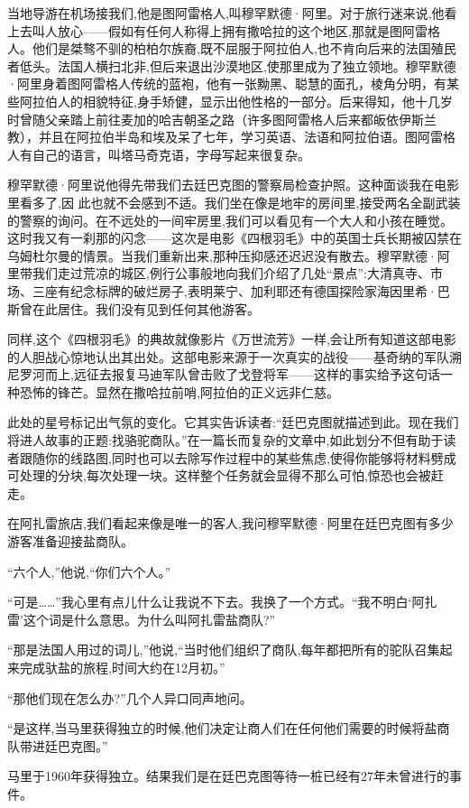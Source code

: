 当地导游在机场接我们,他是图阿雷格人,叫穆罕默德·阿里。对于旅行迷来说,他看上去叫人放心——假如有任何人称得上拥有撒哈拉的这个地区,那就是图阿雷格人。他们是桀骜不驯的柏柏尔族裔,既不屈服于阿拉伯人,也不肯向后来的法国殖民者低头。法国人横扫北非,但后来退出沙漠地区,使那里成为了独立领地。穆罕默德·阿里身着图阿雷格人传统的蓝袍，他有一张黝黑、聪慧的面孔，棱角分明，有某些阿拉伯人的相貌特征,身手矫健，显示出他性格的一部分。后来得知，他十几岁时曾随父亲踏上前往麦加的哈吉朝圣之路（许多图阿雷格人后来都皈依伊斯兰教），并且在阿拉伯半岛和埃及呆了七年，学习英语、法语和阿拉伯语。图阿雷格人有自己的语言，叫塔马奇克语，字母写起来很复杂。

穆罕默德·阿里说他得先带我们去廷巴克图的警察局检查护照。这种面谈我在电影里看多了,因 此也就不会感到不适。我们坐在像是地牢的房间里,接受两名全副武装的警察的询问。在不远处的一间牢房里,我们可以看见有一个大人和小孩在睡觉。这时我又有一刹那的闪念——这次是电影《四根羽毛》中的英国士兵长期被囚禁在乌姆杜尔曼的情景。当我们重新出来,那种压抑感还迟迟没有散去。穆罕默德·阿里带我们走过荒凉的城区,例行公事般地向我们介绍了几处“景点”:大清真寺、市场、三座有纪念标牌的破烂房子,表明莱宁、加利耶还有德国探险家海因里希·巴斯曾在此居住。我们没有见到任何其他游客。

同样,这个《四根羽毛》的典故就像影片《万世流芳》一样,会让所有知道这部电影的人胆战心惊地认出其出处。这部电影来源于一次真实的战役——基奇纳的军队溯尼罗河而上,远征去报复马迪军队曾击败了戈登将军——这样的事实给予这句话一种恐怖的锋芒。显然在撒哈拉前哨,阿拉伯的正义远非仁慈。

此处的星号标记出气氛的变化。它其实告诉读者:“廷巴克图就描述到此。现在我们将进人故事的正题:找骆驼商队。”在一篇长而复杂的文章中,如此划分不但有助于读者跟随你的线路图,同时也可以去除写作过程中的某些焦虑,使得你能够将材料劈成可处理的分块,每次处理一块。这样整个任务就会显得不那么可怕,惊恐也会被赶走。

在阿扎雷旅店,我们看起来像是唯一的客人,我问穆罕默德·阿里在廷巴克图有多少游客准备迎接盐商队。

“六个人,”他说,“你们六个人。”

“可是……”我心里有点儿什么让我说不下去。我换了一个方式。“我不明白‘阿扎雷’这个词是什么意思。为什么叫阿扎雷盐商队?”

“那是法国人用过的词儿,”他说,“当时他们组织了商队,每年都把所有的驼队召集起来完成驮盐的旅程,时间大约在12月初。”

“那他们现在怎么办?”几个人异口同声地问。

“是这样,当马里获得独立的时候,他们决定让商人们在任何他们需要的时候将盐商队带进廷巴克图。”

马里于1960年获得独立。结果我们是在廷巴克图等待一桩已经有27年未曾进行的事件。

